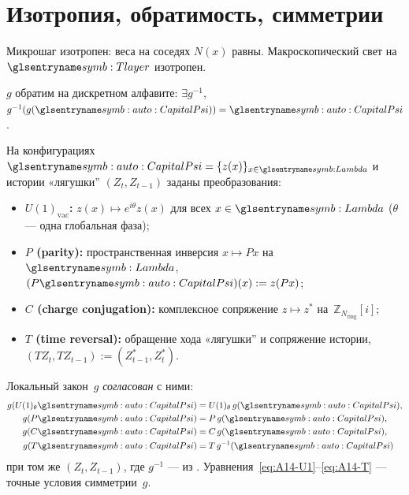 \section{Изотропия, обратимость, симметрии}

\begin{axiom}
\label{ax:A12}
Микрошаг изотропен: веса на соседях $N(x)$ равны.
Макроскопический свет на~$\Tlayer$ изотропен.
\end{axiom}

\begin{axiom}
\label{ax:A13}
$g$ обратим на дискретном алфавите: $\exists g^{-1}$, $g^{-1}(g(\symCapitalPsi))=\symCapitalPsi$.

\end{axiom}

\begin{axiom}
\label{ax:A14}
На конфигурациях $\symCapitalPsi=\{z(x)\}_{x\in\carrierLattice}$ и истории «лягушки'' $(Z_t,Z_{t-1})$
заданы преобразования:
\begin{itemize}[nosep]
\item \textbf{$U(1)_{\mathrm{vac}}$:} $z(x)\mapsto e^{i\theta}z(x)$ для всех $x\in\carrierLattice$
      ($\theta$ --- одна глобальная фаза);
\item \textbf{$P$ (parity):} пространственная инверсия $x\mapsto Px$ на~$\carrierLattice$,
      $(P\symCapitalPsi)(x):=z(Px)$;
\item \textbf{$C$ (charge conjugation):} комплексное сопряжение $z\mapsto z^*$
      на~$\mathbb{Z}_{N_{\mathrm{ring}}}[i]$;
\item \textbf{$T$ (time reversal):} обращение хода «лягушки'' и сопряжение истории,
      $(TZ_t,TZ_{t-1}):=(Z_{t-1}^*,Z_t^*)$.
\end{itemize}
Локальный закон~$g$ \emph{согласован} с ними:
\begin{align}
  g(U(1)_\theta\symCapitalPsi) &= U(1)_\theta\,g(\symCapitalPsi), \label{eq:A14-U1}\\
  g(P\symCapitalPsi) &= P\,g(\symCapitalPsi), \label{eq:A14-P}\\
  g(C\symCapitalPsi) &= C\,g(\symCapitalPsi), \label{eq:A14-C}\\
  g(T\symCapitalPsi) &= T\,g^{-1}(\symCapitalPsi) \label{eq:A14-T}
\end{align}
при том же $(Z_t,Z_{t-1})$, где $g^{-1}$ --- из .
Уравнения~\eqref{eq:A14-U1}--\eqref{eq:A14-T} --- точные условия симметрии~$g$.
\end{axiom}

